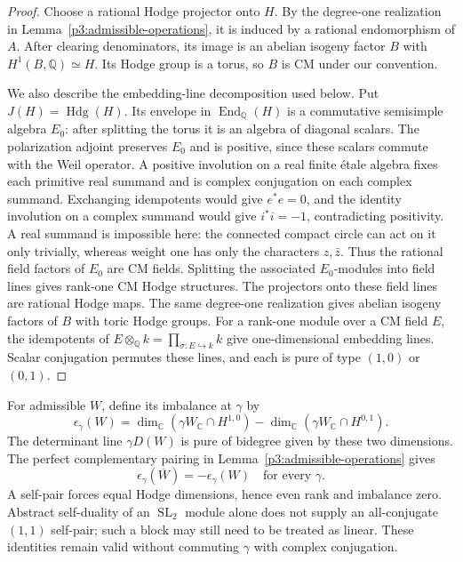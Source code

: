\documentclass[11pt]{article}
\newcommand{\Q}{\mathbb Q}
\newcommand{\C}{\mathbb C}
\numberwithin{equation}{section}
\begin{document}
\begin{proof}
Choose a rational Hodge projector onto $H$.  By the degree-one
realization in Lemma~\ref{p3:admissible-operations}, it is induced by
a rational endomorphism of $A$.  After clearing denominators, its
image is an abelian isogeny factor $B$ with $H^1(B,\Q)\simeq H$.
Its Hodge group is a torus, so $B$ is CM under our convention.

We also describe the embedding-line decomposition used below.
Put $J(H)=\operatorname{Hdg}(H)$.  Its envelope in
$\operatorname{End}_\Q(H)$ is a commutative
semisimple algebra $E_0$: after splitting the torus it is an algebra
of diagonal scalars.  The polarization adjoint preserves $E_0$
and is positive, since these scalars commute with the Weil operator.
A positive involution on a real finite \'etale algebra fixes each
primitive real summand and is complex conjugation on each complex
summand.  Exchanging idempotents would give $e^*e=0$, and the
identity involution on a complex summand would give $i^*i=-1$,
contradicting positivity.  A real summand is impossible here:
the connected compact circle can act on it only trivially, whereas
weight one has only the characters $z,\bar z$.  Thus the rational
field factors of $E_0$ are CM fields.  Splitting the associated
$E_0$-modules into field lines gives rank-one CM Hodge structures.
The projectors onto these field lines are rational Hodge maps.
The same degree-one realization gives abelian isogeny factors of
$B$ with toric Hodge groups.  For a rank-one module over a CM field
$E$, the idempotents of
$E\otimes_\Q k=\prod_{\sigma:E\hookrightarrow k}k$
give one-dimensional embedding lines.  Scalar conjugation
permutes these lines, and each is pure of type $(1,0)$ or
$(0,1)$.
\end{proof}

For admissible $W$, define its imbalance at $\gamma$ by
\[
 \epsilon_\gamma(W)=
 \dim_\C(\gamma W_\C\cap H^{1,0})
 -\dim_\C(\gamma W_\C\cap H^{0,1}).
\]
The determinant line $\gamma D(W)$ is pure of bidegree given by
these two dimensions.  The perfect complementary pairing in
Lemma~\ref{p3:admissible-operations} gives
\begin{equation}
 \label{p3:eq:opposite-imbalance}
 \epsilon_\gamma(\overline W)=-\epsilon_\gamma(W)
 \quad\text{for every }\gamma.
\end{equation}
A self-pair forces equal Hodge dimensions, hence even rank and
imbalance zero.  Abstract self-duality of an $\operatorname{SL}_2$
module alone does not supply an all-conjugate $(1,1)$ self-pair;
such a block may still need to be treated as linear.  These identities remain valid
without commuting $\gamma$ with complex conjugation.
\end{document}
